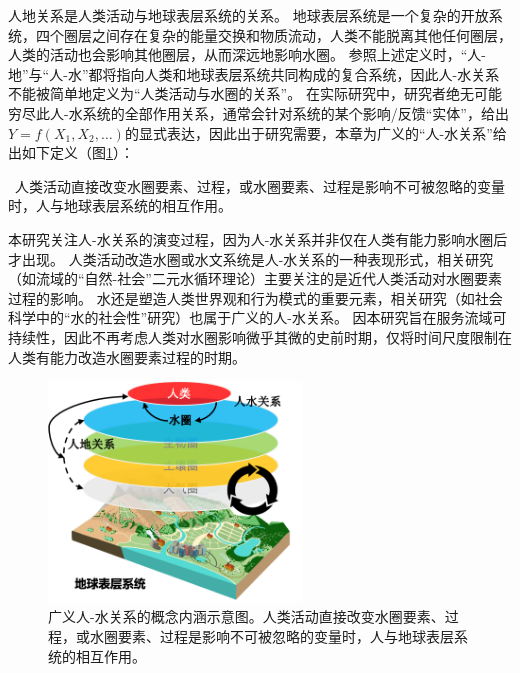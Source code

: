 人地关系是人类活动与地球表层系统的关系\cite{wu1991,li2016d}。
地球表层系统是一个复杂的开放系统，四个圈层之间存在复杂的能量交换和物质流动，人类不能脱离其他任何圈层，人类的活动也会影响其他圈层，从而深远地影响水圈。
参照上述定义时，“人-地”与“人-水”都将指向人类和地球表层系统共同构成的复合系统，因此人-水关系不能被简单地定义为“人类活动与水圈的关系”。
在实际研究中，研究者绝无可能穷尽此人-水系统的全部作用关系，通常会针对系统的某个影响/反馈“实体”，给出$Y = f(X_1, X_2, \dots)$的显式表达，因此出于研究需要，本章为广义的“人-水关系”给出如下定义（图\ref{ch2:fig:definitions}）：

{\kai~人类活动直接改变水圈要素、过程，或水圈要素、过程是影响不可被忽略的变量时，人与地球表层系统的相互作用。}

本研究关注人-水关系的演变过程，因为人-水关系并非仅在人类有能力影响水圈后才出现。
人类活动改造水圈或水文系统是人-水关系的一种表现形式，相关研究（如流域的“自然-社会”二元水循环理论）主要关注的是近代人类活动对水圈要素过程的影响\cite{wang2006, wang2016}。
水还是塑造人类世界观和行为模式的重要元素，相关研究（如社会科学中的“水的社会性”研究）也属于广义的人-水关系。
因本研究旨在服务流域可持续性，因此不再考虑人类对水圈影响微乎其微的史前时期，仅将时间尺度限制在人类有能力改造水圈要素过程的时期。

\begin{figure}[!ht]
    \centering
    \includegraphics[width=0.6\textwidth]{img/ch2/ch2_scope.png}
    \caption[广义人-水关系的概念内涵示意图]{广义人-水关系的概念内涵示意图。人类活动直接改变水圈要素、过程，或水圈要素、过程是影响不可被忽略的变量时，人与地球表层系统的相互作用。}\label{ch2:fig:definitions}
\end{figure}


